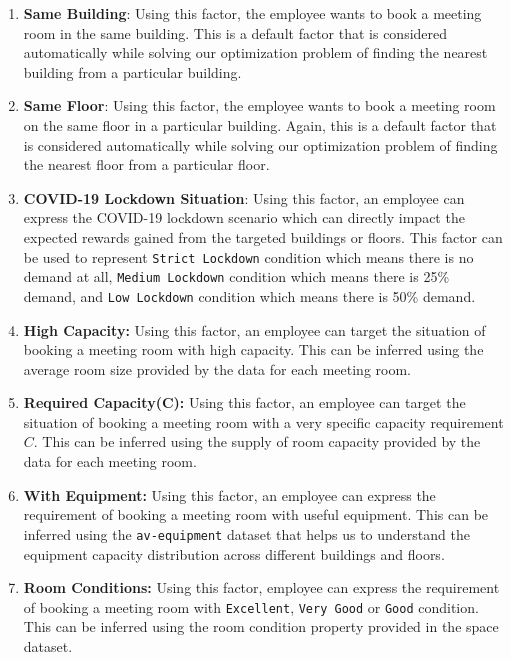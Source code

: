 \begin{enumerate}
    \item \textbf{Same Building}: Using this factor, the employee wants to book a meeting room in the same building. This is a default factor that is considered automatically while solving our optimization problem of finding the nearest building from a particular building.
    
    \item \textbf{Same Floor}: Using this factor, the employee wants to book a meeting room on the same floor in a particular building. Again, this is a default factor that is considered automatically while solving our optimization problem of finding the nearest floor from a particular floor.
    
    \item \textbf{COVID-19 Lockdown Situation}: Using this factor, an employee can express the COVID-19 lockdown scenario which can directly impact the expected rewards gained from the targeted buildings or floors. This factor can be used to represent \texttt{Strict Lockdown} condition which means there is no demand at all, \texttt{Medium Lockdown} condition which means there is 25\% demand, and \texttt{Low Lockdown} condition which means there is 50\% demand.
    
    \item \textbf{High Capacity:} Using this factor, an employee can target the situation of booking a meeting room with high capacity. This can be inferred using the average room size provided by the data for each meeting room.
    
    \item \textbf{Required Capacity(C):} Using this factor, an employee can target the situation of booking a meeting room with a very specific capacity requirement $C$. This can be inferred using the supply of room capacity provided by the data for each meeting room.
    
    \item \textbf{With Equipment:} Using this factor, an employee can express the requirement of booking a meeting room with useful equipment. This can be inferred using the \texttt{av-equipment} dataset that helps us to understand the equipment capacity distribution across different buildings and floors.
    
    \item \textbf{Room Conditions:} Using this factor, employee can express the requirement of booking a meeting room with \texttt{Excellent}, \texttt{Very Good} or \texttt{Good} condition. This can be inferred using the room condition property provided in the space dataset.
    

\end{enumerate}
